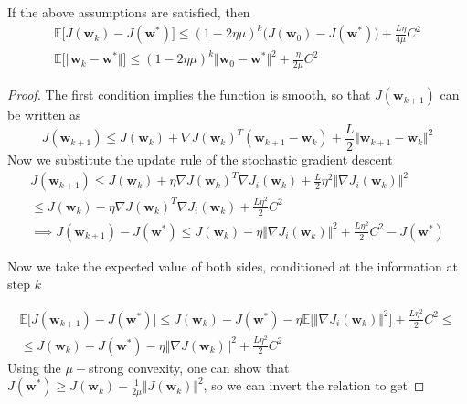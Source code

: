 \documentclass{article}
\numberwithin{equation}{subsection}
\begin{document}
\begin{theorem}
    If the above assumptions are satisfied, then
    \begin{gather}
        \mathbb{E}\big[ J(\textbf{w}_k) - J(\textbf{w}^*) \big] \leq (1-2\eta \mu)^k \big( J(\textbf{w}_0) - J(\textbf{w}^*) \big) + \frac{L\eta}{4\mu} C^2 \\
        \mathbb{E}\big[ \Vert \textbf{w}_k - \textbf{w}^* \Vert \big] \leq (1-2\eta\mu)^k \Vert \textbf{w}_0-\textbf{w}^* \Vert^2 + \frac{\eta}{2\mu}C^2
    \end{gather}
\end{theorem}
\begin{proof}
    The first condition implies the function is smooth, so that $J(\textbf{w}_{k+1})$ can be written as
    \begin{equation*}
        J(\textbf{w}_{k+1}) \leq J(\textbf{w}_k) + \nabla J(\textbf{w}_k)^T (\textbf{w}_{k+1}-\textbf{w}_k) + \frac{L}{2} \Vert \textbf{w}_{k+1}-\textbf{w}_k \Vert^2
    \end{equation*}
    Now we substitute the update rule of the stochastic gradient descent
    \begin{gather*}
        J(\textbf{w}_{k+1}) \leq J(\textbf{w}_k) + \eta \nabla J(\textbf{w}_k)^T \nabla J_i(\textbf{w}_k) + \frac{L}{2} \eta^2 \Vert \nabla J_i(\textbf{w}_k) \Vert^2 \\
        \leq J(\textbf{w}_k) - \eta \nabla J(\textbf{w}_k)^T \nabla J_i(\textbf{w}_k) + \frac{L\eta^2}{2}C^2 \\
        \implies J(\textbf{w}_{k+1}) - J(\textbf{w}^*) \leq   J(\textbf{w}_k) - \eta \Vert \nabla J_i(\textbf{w}_k) \Vert^2 + \frac{L\eta^2}{2}C^2 - J(\textbf{w}^*)
    \end{gather*}

    Now we take the expected value of both sides, conditioned at the information at step $k$

    \begin{gather*}
        \mathbb{E}\big[ J(\textbf{w}_{k+1}) - J(\textbf{w}^*) \big] \leq J(\textbf{w}_k) - J(\textbf{w}^*) - \eta \mathbb{E}\big[\Vert \nabla J_i(\textbf{w}_k)\Vert^2\big]  + \frac{L\eta^2}{2}C^2 \leq \\
        \leq J(\textbf{w}_k) - J(\textbf{w}^*) - \eta \Vert \nabla J(\textbf{w}_k) \Vert^2 + \frac{L\eta^2}{2}C^2
    \end{gather*}
    Using the $\mu-$strong convexity, one can show that $J(\textbf{w}^*) \geq J(\textbf{w}_k) - \frac{1}{2\mu} \Vert J(\textbf{w}_k) \Vert^2$, so we can invert the relation to get


\end{proof}
\end{document}
